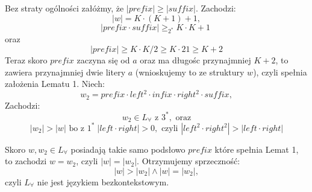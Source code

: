 \documentclass{article}
\begin{document}
Bez straty ogólności załóżmy, że $|prefix| \ge |suffix|$. \newline
Zachodzi: 
$$ |w| = K \cdot (K+1) + 1, $$
$$|prefix \cdot suffix| \ge_{2^*} K \cdot K + 1 \; \mbox{}$$
oraz
$$|prefix| \ge K \cdot K/2 \ge K \cdot 21 \ge K + 2$$
Teraz skoro $prefix$ zaczyna się od $a$ oraz ma długośc przynajmniej $K+2$, to zawiera przynajmniej dwie litery $a$ (wnioskujemy to ze struktury $w$), czyli spełnia założenia Lematu 1. \newline 
Niech:
$$w_2 = prefix \cdot left^2 \cdot infix \cdot right^2 \cdot suffix,$$
Zachodzi:
$$w_2 \in L_{\forall} \mbox{ z } 3^*, \mbox{ oraz}$$ 
$$|w_2| > |w| \mbox{ bo z } 1^* \; |left \cdot right| > 0, \mbox{ czyli } |left^2 \cdot right^2| > |left \cdot right|$$

Skoro $w, w_2 \in L_{\forall}$ posiadają takie samo podsłowo $prefix$ które spełnia Lemat 1, to zachodzi $w = w_2$,
czyli $|w| = |w_2|$. \newline \newline
Otrzymujemy sprzeczność:
$$ |w| > |w_2| \land |w| = |w_2|,$$
czyli $L_{\forall}$ nie jest językiem bezkontekstowym.
\end{document}
